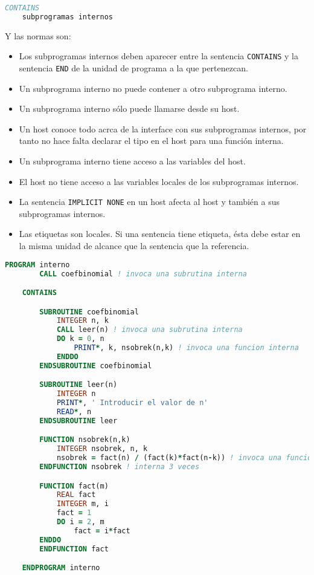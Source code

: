 \begin{lstlisting}[language=Fortran]
	CONTAINS
	subprogramas internos
\end{lstlisting}
Y las normas son:

\begin{itemize}
	\item Los subprogramas internos deben aparecer entre la sentencia {\tt CONTAINS} y la sentencia {\tt END} de la unidad de programa a la que pertenezcan. 
	\item Un subprograma interno no puede contener a otro subprograma interno.
	\item Un subprograma interno sólo puede llamarse desde su host.
	\item Un host conoce todo acrca de la interface con sus subprogramas internos, por tanto no hace falta declarar el tipo en el host para una función interna.
	\item Un subprograma interno tiene acceso a las variables del host.
	\item El host no tiene acceso a las variables locales de los subprogramas internos.
	\item La sentencia {\tt IMPLICIT NONE} en un host afecta al host y también a sus subprogramas internos. 
	\item Las etiquetas son locales. Si una sentencia tiene etiqueta, ésta debe estar en la misma unidad de alcance que la sentencia que la referencia.
\end{itemize}

\begin{lstlisting}[language=Fortran]
	PROGRAM interno
		CALL coefbinomial ! invoca una subrutina interna

	CONTAINS

		SUBROUTINE coefbinomial
			INTEGER n, k
			CALL leer(n) ! invoca una subrutina interna
			DO k = 0, n
				PRINT*, k, nsobrek(n,k) ! invoca una funcion interna
			ENDDO
		ENDSUBROUTINE coefbinomial

		SUBROUTINE leer(n)
			INTEGER n
			PRINT*, ' Introducir el valor de n'
			READ*, n
		ENDSUBROUTINE leer

		FUNCTION nsobrek(n,k)
			INTEGER nsobrek, n, k
			nsobrek = fact(n) / (fact(k)*fact(n-k)) ! invoca una funcion
		ENDFUNCTION nsobrek ! interna 3 veces

		FUNCTION fact(m)
			REAL fact
			INTEGER m, i
			fact = 1
			DO i = 2, m
				fact = i*fact
		ENDDO
		ENDFUNCTION fact

	ENDPROGRAM interno
\end{lstlisting}


